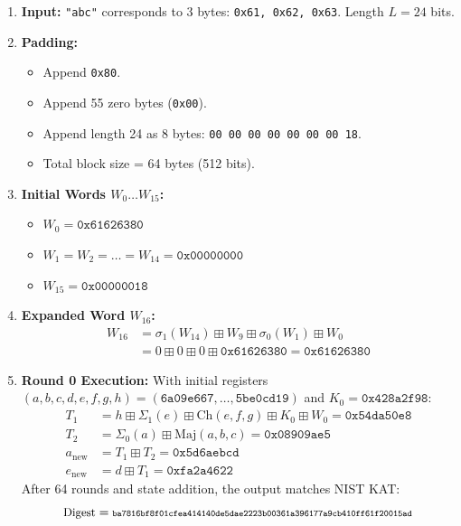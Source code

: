 \begin{enumerate}
    \item \textbf{Input:} \texttt{"abc"} corresponds to 3 bytes: \texttt{0x61, 0x62, 0x63}. Length $L = 24$ bits.
    \item \textbf{Padding:}
    \begin{itemize}
        \item Append \texttt{0x80}.
        \item Append 55 zero bytes (\texttt{0x00}).
        \item Append length 24 as 8 bytes: \texttt{00 00 00 00 00 00 00 18}.
        \item Total block size = 64 bytes (512 bits).
    \end{itemize}
    \item \textbf{Initial Words $W_0 \dots W_{15}$:}
    \begin{itemize}
        \item $W_0 = \texttt{0x61626380}$
        \item $W_1 = W_2 = \dots = W_{14} = \texttt{0x00000000}$
        \item $W_{15} = \texttt{0x00000018}$
    \end{itemize}
    \item \textbf{Expanded Word $W_{16}$:}
    \begin{align}
    W_{16} &= \sigma_1(W_{14}) \boxplus W_9 \boxplus \sigma_0(W_1) \boxplus W_0 \nonumber \\
           &= 0 \boxplus 0 \boxplus 0 \boxplus \texttt{0x61626380} = \texttt{0x61626380}
    \end{align}
    \item \textbf{Round 0 Execution:}
    With initial registers $(a, b, c, d, e, f, g, h) = (\texttt{6a09e667}, \dots, \texttt{5be0cd19})$ and $K_0 = \texttt{0x428a2f98}$:
    \begin{align*}
    T_1 &= h \boxplus \Sigma_1(e) \boxplus \text{Ch}(e,f,g) \boxplus K_0 \boxplus W_0 = \texttt{0x54da50e8} \\
    T_2 &= \Sigma_0(a) \boxplus \text{Maj}(a,b,c) = \texttt{0x08909ae5} \\
    a_{\text{new}} &= T_1 \boxplus T_2 = \texttt{0x5d6aebcd} \\
    e_{\text{new}} &= d \boxplus T_1 = \texttt{0xfa2a4622}
    \end{align*}
    After 64 rounds and state addition, the output matches NIST KAT:
    \begin{equation}
    {\small\text{Digest} = {\scriptsize\texttt{ba7816bf8f01cfea414140de5dae2223b00361a396177a9cb410ff61f20015ad}}}
    \end{equation}
\end{enumerate}


